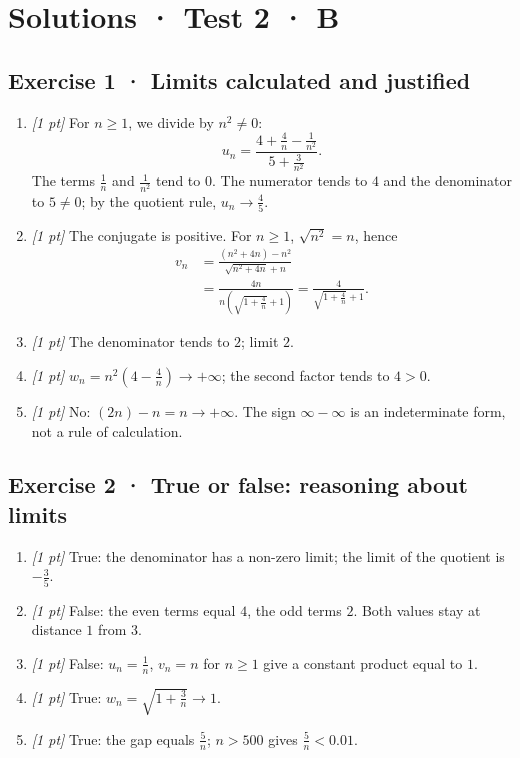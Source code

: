 \ifprof\clearpage

\section*{Solutions · Test 2 · B}\label{cor:2-4}

\subsection*{Exercise 1 · Limits calculated and justified}\begin{enumerate}

\item \textit{[1 pt]} For $n\ge1$, we divide by $n^2\ne0$:
\[u_n=\frac{4+\frac{4}{n}-\frac{1}{n^2}}{5+\frac{3}{n^2}}.\]
The terms $\frac{1}{n}$ and $\frac{1}{n^2}$ tend to $0$. The numerator tends to $4$ and the denominator to $5\ne0$; by the quotient rule, $u_n\to\frac{4}{5}$.

\item \textit{[1 pt]} The conjugate is positive. For $n\ge1$, $\sqrt{n^2}=n$, hence
\[\begin{aligned}v_n&=\frac{(n^2+4n)-n^2}{\sqrt{n^2+4n}+n}\\&=\frac{4n}{n(\sqrt{1+\frac{4}{n}}+1)}=\frac{4}{\sqrt{1+\frac{4}{n}}+1}.\end{aligned}\]

\item \textit{[1 pt]} The denominator tends to $2$; limit $2$.

\item \textit{[1 pt]} $w_n=n^2(4-\frac{4}{n})\to+\infty$; the second factor tends to $4>0$.

\item \textit{[1 pt]} No: $(2n)-n=n\to+\infty$. The sign $\infty-\infty$ is an indeterminate form, not a rule of calculation.

\end{enumerate}

\subsection*{Exercise 2 · True or false: reasoning about limits}\begin{enumerate}

\item \textit{[1 pt]} True: the denominator has a non-zero limit; the limit of the quotient is $-\frac{3}{5}$.

\item \textit{[1 pt]} False: the even terms equal $4$, the odd terms $2$. Both values stay at distance $1$ from $3$.

\item \textit{[1 pt]} False: $u_n=\frac{1}{n}$, $v_n=n$ for $n\ge1$ give a constant product equal to $1$.

\item \textit{[1 pt]} True: $w_n=\sqrt{1+\frac{3}{n}}\to1$.

\item \textit{[1 pt]} True: the gap equals $\frac{5}{n}$; $n>500$ gives $\frac{5}{n}<0.01$.

\end{enumerate}

